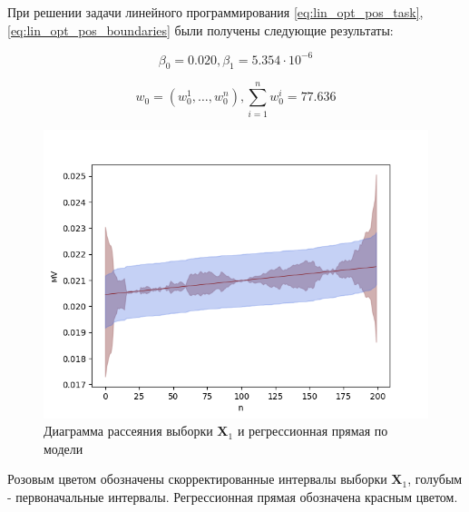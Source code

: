 При решении задачи линейного программирования \eqref{eq:lin_opt_pos_task}, \eqref{eq:lin_opt_pos_boundaries} были получены следующие результаты: 

\begin{equation*}
	\beta_0 = 0.020, \beta_1 = 5.354 \cdot 10 ^ {-6} 
\end{equation*}

\begin{equation*}
	w_0 = (w^{1}_0, \ldots, w^{n}_0), \sum\limits_{i=1}^{n} w^{i}_0 = 77.636
\end{equation*}

\begin{figure}[H]
	\begin{center}
		\includegraphics[scale = 0.55]{resources/diagram_and_regress_0.png}
	\end{center}
	\caption{Диаграмма рассеяния выборки $\bm{X}_1$ и регрессионная прямая по модели} \label{pic:lin_opt_pos_task}
\end{figure}

Розовым цветом обозначены скорректированные интервалы выборки $\bm{X}_1$, голубым - первоначальные интервалы. Регрессионная прямая обозначена красным цветом. 

